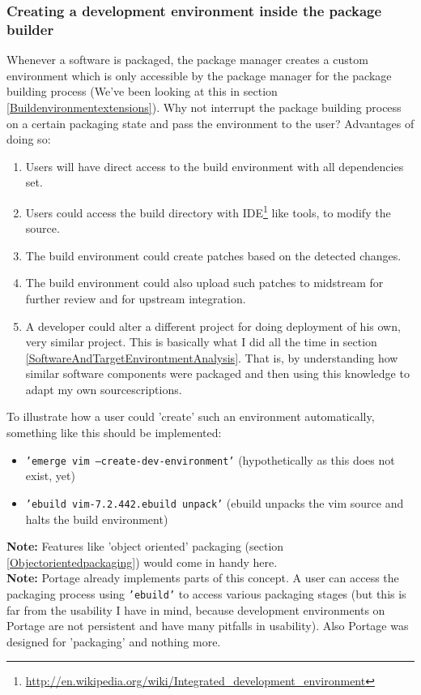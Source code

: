 \documentclass[a4paper,10pt]{article}
\begin{document}
\subsubsection{Creating a development environment inside the package builder}
\label{creatingadevelopmentenvironment}
Whenever a software is packaged, the package manager creates a custom environment which is only accessible by the package manager for the package building process (We've been looking at this in section \ref{Buildenvironmentextensions}). Why not interrupt the package building process on a certain packaging state and pass the environment to the user? Advantages of doing so:
\begin{enumerate}
\item Users will have direct access to the build environment with all dependencies set.
\item Users could access the build directory with IDE\footnote{\url{http://en.wikipedia.org/wiki/Integrated_development_environment}} like tools, to modify the source.
\item The build environment could create patches based on the detected changes.
\item The build environment could also upload such patches to midstream for further review and for upstream integration.
\item A developer could alter a different project for doing deployment of his own, very similar project. This is basically what I did all the time in section \ref{SoftwareAndTargetEnvirontmentAnalysis}. That is, by understanding how similar software components were packaged and then using this knowledge to adapt my own sourcescriptions.
\end{enumerate}


To illustrate how a user could 'create' such an environment automatically, something like this should be implemented:
\begin{itemize}
\item \texttt{'emerge vim --create-dev-environment'}  (hypothetically as this does not exist, yet)
\item \texttt{'ebuild vim-7.2.442.ebuild unpack'} (ebuild unpacks the vim source and halts the build environment)
\end{itemize}

\textbf{Note:} Features like 'object oriented' packaging (section \ref{Objectorientedpackaging}) would come in handy here.\\

\textbf{Note:} Portage already implements parts of this concept. A user can access the packaging process using \texttt{'ebuild'} to access various packaging stages (but this is far from the usability I have in mind, because development environments on Portage are not persistent and have many pitfalls in usability). Also Portage was designed for 'packaging' and nothing more.\\
\end{document}
